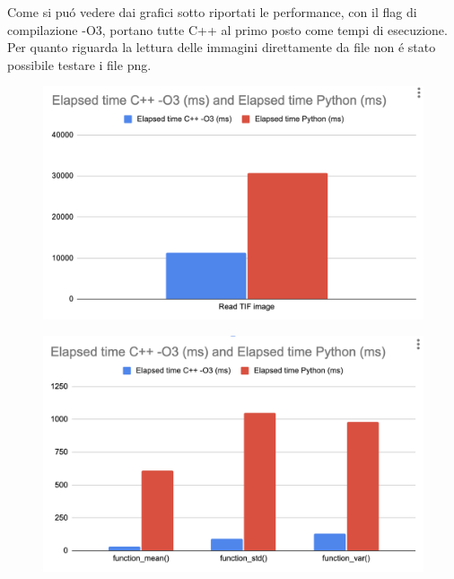 \documentclass{article}
\begin{document}
Come si puó vedere dai grafici sotto riportati le performance, con il flag di compilazione -O3, portano tutte C++ al primo posto come tempi di esecuzione.
Per quanto riguarda la lettura delle immagini direttamente da file non é stato possibile testare i file png.


\begin{figure}[h]
\includegraphics[width=\textwidth]{Performance 1.png}
\end{figure}
\begin{figure}[h]
\includegraphics[width=\textwidth]{Performance 2.png}
\end{figure}
\end{document}

